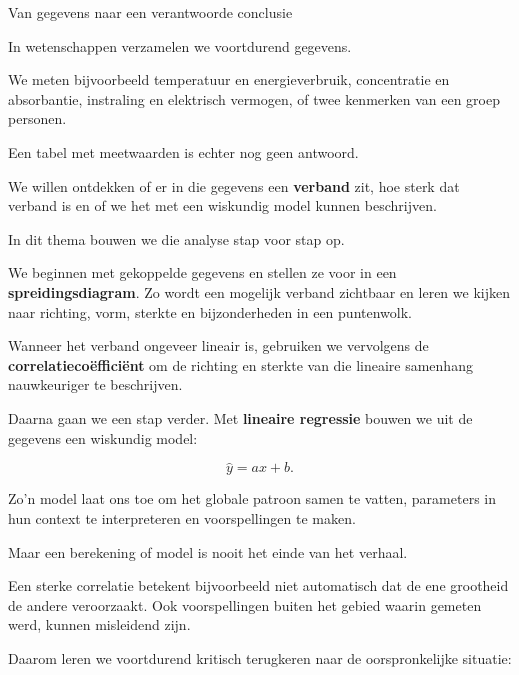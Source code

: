 \documentclass{xourse}
\begin{document}
\begin{hoofdstukoverzicht}
\end{hoofdstukoverzicht}

\begin{themaintro}{Van gegevens naar een verantwoorde conclusie}

  In wetenschappen verzamelen we voortdurend gegevens.

  We meten bijvoorbeeld temperatuur en energieverbruik,
  concentratie en absorbantie, instraling en elektrisch vermogen,
  of twee kenmerken van een groep personen.

  Een tabel met meetwaarden is echter nog geen antwoord.

  We willen ontdekken of er in die gegevens een \textbf{verband} zit,
  hoe sterk dat verband is en of we het met een wiskundig model
  kunnen beschrijven.

  In dit thema bouwen we die analyse stap voor stap op.

  We beginnen met gekoppelde gegevens en stellen ze voor in een
  \textbf{spreidingsdiagram}. Zo wordt een mogelijk verband zichtbaar
  en leren we kijken naar richting, vorm, sterkte en bijzonderheden
  in een puntenwolk.

  Wanneer het verband ongeveer lineair is, gebruiken we vervolgens
  de \textbf{correlatiecoëfficiënt} om de richting en sterkte van
  die lineaire samenhang nauwkeuriger te beschrijven.

  Daarna gaan we een stap verder.
  Met \textbf{lineaire regressie} bouwen we uit de gegevens een
  wiskundig model:

  \[
    \hat y=ax+b.
  \]

  Zo'n model laat ons toe om het globale patroon samen te vatten,
  parameters in hun context te interpreteren en voorspellingen te
  maken.

  Maar een berekening of model is nooit het einde van het verhaal.

  Een sterke correlatie betekent bijvoorbeeld niet automatisch dat
  de ene grootheid de andere veroorzaakt. Ook voorspellingen buiten
  het gebied waarin gemeten werd, kunnen misleidend zijn.

  Daarom leren we voortdurend kritisch terugkeren naar de
  oorspronkelijke situatie:


\end{themaintro}
\end{document}
